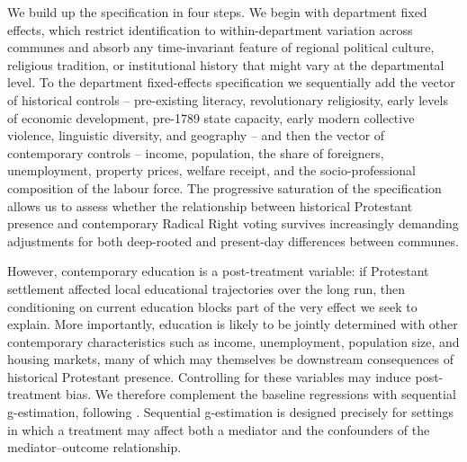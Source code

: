 \documentclass[12pt]{article}
\begin{document}
We build up the specification in four steps. We begin with department fixed effects, which restrict identification to within-department variation across communes and absorb any time-invariant feature of regional political culture, religious tradition, or institutional history that might vary at the departmental level. To the department fixed-effects specification we sequentially add the vector of historical controls -- pre-existing literacy, revolutionary religiosity, early levels of economic development, pre-1789 state capacity, early modern collective violence, linguistic diversity, and geography -- and then the vector of contemporary controls -- income, population, the share of foreigners, unemployment, property prices, welfare receipt, and the socio-professional composition of the labour force. The progressive saturation of the specification allows us to assess whether the relationship between historical Protestant presence and contemporary Radical Right voting survives increasingly demanding adjustments for both deep-rooted and present-day differences between communes.

However, contemporary education is a post-treatment variable: if Protestant settlement affected local educational trajectories over the long run, then conditioning on current education blocks part of the very effect we seek to explain. More importantly, education is likely to be jointly determined with other contemporary characteristics such as income, unemployment, population size, and housing markets, many of which may themselves be downstream consequences of historical Protestant presence. Controlling for these variables may induce post-treatment bias. We therefore complement the baseline regressions with sequential g-estimation, following \textcite{acharyaExplainingCausalFindings2016}. Sequential g-estimation is designed precisely for settings in which a treatment may affect both a mediator and the confounders of the mediator--outcome relationship. 
\end{document}

